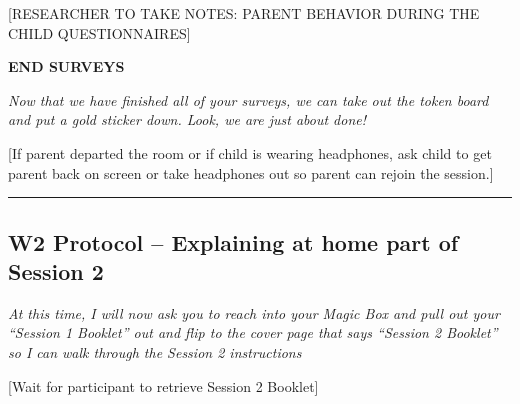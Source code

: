 \documentclass[]{book}
\begin{document}
{[}RESEARCHER TO TAKE NOTES: PARENT BEHAVIOR DURING THE CHILD QUESTIONNAIRES{]}

\textbf{END SURVEYS}

\emph{Now that we have finished all of your surveys, we can take out the token board and put a gold sticker down. Look, we are just about done!}

{[}If parent departed the room or if child is wearing headphones, ask child to get parent back on screen or take headphones out so parent can rejoin the session.{]}

\begin{center}\rule{0.5\linewidth}{0.5pt}\end{center}

\hypertarget{w2-protocol-explaining-at-home-part-of-session-2}{%
\subsection{W2 Protocol -- Explaining at home part of Session 2}\label{w2-protocol-explaining-at-home-part-of-session-2}}

\emph{At this time, I will now ask you to reach into your Magic Box and pull out your ``Session 1 Booklet'' out and flip to the cover page that says ``Session 2 Booklet'' so I can walk through the Session 2 instructions}

{[}Wait for participant to retrieve Session 2 Booklet{]}
\end{document}
